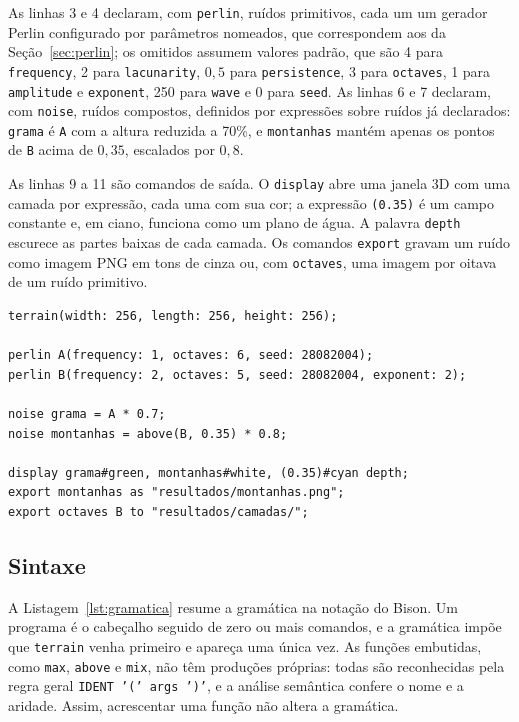 \documentclass[sigconf, nonacm, screen, language=portuguese, language={main=english}]{acmart}
\begin{document}
As linhas 3 e 4 declaram, com \texttt{perlin}, ruídos primitivos, cada um um gerador Perlin
configurado por parâmetros nomeados, que correspondem aos da
Seção~\ref{sec:perlin}; os omitidos assumem valores padrão, que são
4 para \texttt{frequency}, 2 para \texttt{lacunarity}, $0{,}5$ para
\texttt{persistence}, 3 para \texttt{octaves}, 1 para
\texttt{amplitude} e \texttt{exponent}, 250 para \texttt{wave} e 0
para \texttt{seed}. As linhas 6
e 7 declaram, com \texttt{noise}, ruídos compostos, definidos por expressões sobre ruídos já
declarados: \texttt{grama} é \texttt{A} com a altura reduzida a 70\%, e
\texttt{montanhas} mantém apenas os pontos de \texttt{B} acima de
$0{,}35$, escalados por $0{,}8$.

As linhas 9 a 11 são comandos de saída. O \texttt{display} abre uma
janela 3D com uma camada por expressão, cada uma com sua cor; a
expressão \texttt{(0.35)} é um campo constante e, em ciano, funciona
como um plano de água. A palavra \texttt{depth} escurece as
partes baixas de cada camada. Os comandos \texttt{export} gravam um
ruído como imagem PNG em tons de cinza ou, com \texttt{octaves}, uma
imagem por oitava de um ruído primitivo.

\begin{lstlisting}[caption={Exemplo de uso da Topograf.}, label={lst:exemplo}, float=t]
terrain(width: 256, length: 256, height: 256);

perlin A(frequency: 1, octaves: 6, seed: 28082004);
perlin B(frequency: 2, octaves: 5, seed: 28082004, exponent: 2);

noise grama = A * 0.7;
noise montanhas = above(B, 0.35) * 0.8;

display grama#green, montanhas#white, (0.35)#cyan depth;
export montanhas as "resultados/montanhas.png";
export octaves B to "resultados/camadas/";
\end{lstlisting}

\subsection{Sintaxe}\label{sec:sintaxe}
A Listagem~\ref{lst:gramatica} resume a gramática na notação do Bison.
Um programa é o cabeçalho seguido de zero ou mais comandos, e a
gramática impõe que \texttt{terrain} venha primeiro e apareça uma única
vez. As funções embutidas, como \texttt{max}, \texttt{above} e
\texttt{mix}, não têm produções próprias: todas são reconhecidas
pela regra geral \texttt{IDENT '(' args ')'}, e a análise semântica
confere o nome e a aridade. Assim, acrescentar uma função não altera a
gramática.
\end{document}
